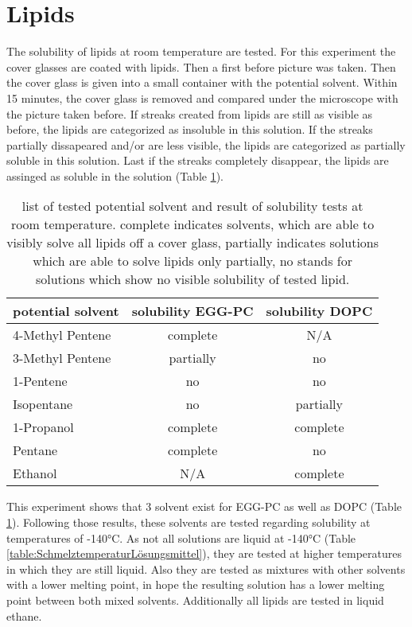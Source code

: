 
\section{Lipids}

The solubility of lipids at room temperature are tested. For this experiment the cover glasses are coated with lipids. Then a first before picture was taken. Then the cover glass is given into a small container with the potential solvent. Within 15 minutes, the cover glass is removed and compared under the microscope with the picture taken before. If streaks created from lipids are still as visible as before, the lipids are categorized as insoluble in this solution. If the streaks partially dissapeared and/or are less visible, the lipids are categorized as partially soluble in this solution. Last if the streaks completely disappear, the lipids are assinged as soluble in the solution (Table \ref{table:LoeslichkeitRaumtemperatur}).


\begin{table}[h]
	\centering
	\begin{tabular}{|l|c|c|}
		\hline
		potential solvent & solubility EGG-PC & solubility DOPC \\
		\hline
		\hline
		4-Methyl Pentene & complete & N/A  \\ 
		\hline
		3-Methyl Pentene & partially & no \\
		\hline
		1-Pentene & no & no \\
		\hline
		Isopentane & no & partially\\
		\hline
		1-Propanol & complete & complete\\
		\hline
		Pentane & complete & no\\
		\hline
		Ethanol & N/A & complete\\
		\hline
	\end{tabular}
	\caption{list of tested potential solvent and result of solubility tests at room temperature. complete indicates solvents, which are able to visibly solve all lipids off a cover glass, partially indicates solutions which are able to solve lipids only partially, no stands for solutions which show no visible solubility of tested lipid.}
	\label{table:LoeslichkeitRaumtemperatur}
\end{table}

This experiment shows that 3 solvent exist for EGG-PC as well as DOPC (Table \ref{table:LoeslichkeitRaumtemperatur}). Following those results, these solvents are tested regarding solubility at temperatures of -140°C. As not all solutions are liquid at -140°C (Table \ref{table:SchmelztemperaturLösungsmittel}), they are tested at higher temperatures in which they are still liquid. Also they are tested as mixtures with other solvents with a lower melting point, in hope the resulting solution has a lower melting point between both mixed solvents. Additionally all lipids are tested in liquid ethane.

